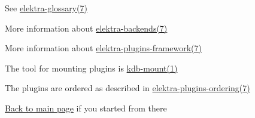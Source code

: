 \begin{DoxyItemize}
\item See \hyperlink{md_doc_help_elektra-glossary_doc_help_elektra-glossary_md}{elektra-\/glossary(7)}
\item More information about \hyperlink{md_doc_help_elektra-backends_doc_help_elektra-backends_md}{elektra-\/backends(7)}
\item More information about \hyperlink{md_doc_help_elektra-plugins-framework_doc_help_elektra-plugins-framework_md}{elektra-\/plugins-\/framework(7)}
\item The tool for mounting plugins is \hyperlink{md_doc_help_kdb-mount_doc_help_kdb-mount_md}{kdb-\/mount(1)}
\item The plugins are ordered as described in \hyperlink{md_doc_help_elektra-plugins-ordering_doc_help_elektra-plugins-ordering_md}{elektra-\/plugins-\/ordering(7)}
\item \hyperlink{README_md}{Back to main page} if you started from there 
\end{DoxyItemize}